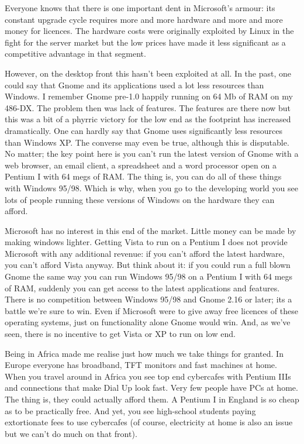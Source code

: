 \documentclass{memoir}
\begin{document}
Everyone knows that there is one important dent in Microsoft's armour:
its constant upgrade cycle requires more and more hardware and more
and more money for licences. The hardware costs were originally
exploited by Linux in the fight for the server market but the low
prices have made it less significant as a competitive advantage in
that segment.

However, on the desktop front this hasn't been exploited at all. In
the past, one could say that Gnome and its applications used a lot
less resources than Windows. I remember Gnome pre-1.0 happily running
on 64 Mb of RAM on my 486-DX. The problem then was lack of
features. The features are there now but this was a bit of a phyrric
victory for the low end as the footprint has increased
dramatically. One can hardly say that Gnome uses significantly less
resources than Windows XP. The converse may even be true, although
this is disputable. No matter; the key point here is you can't run the
latest version of Gnome with a web browser, an email client, a
spreadsheet and a word processor open on a Pentium I with 64 megs of
RAM. The thing is, you can do all of these things with Windows
95/98. Which is why, when you go to the developing world you see lots
of people running these versions of Windows on the hardware they can
afford.

Microsoft has no interest in this end of the market. Little money can
be made by making windows lighter. Getting Vista to run on a Pentium I
does not provide Microsoft with any additional revenue: if you can't
afford the latest hardware, you can't afford Vista anyway. But think
about it: if you could run a full blown Gnome the same way you can run
Windows 95/98 on a Pentium I with 64 megs of RAM, suddenly you can get
access to the latest applications and features. There is no
competition between Windows 95/98 and Gnome 2.16 or later; its a
battle we're sure to win. Even if Microsoft were to give away free
licences of these operating systems, just on functionality alone Gnome
would win. And, as we've seen, there is no incentive to get Vista or
XP to run on low end.

Being in Africa made me realise just how much we take things for
granted. In Europe everyone has broadband, TFT monitors and fast
machines at home. When you travel around in Africa you see top end
cybercafes with Pentium IIIs and connections that make Dial Up look
fast. Very few people have PCs at home. The thing is, they could
actually afford them. A Pentium I in England is so cheap as to be
practically free. And yet, you see high-school students paying
extortionate fees to use cybercafes (of course, electricity at home is
also an issue but we can't do much on that front).
\end{document}
